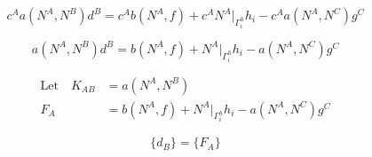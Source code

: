 \documentclass[a4paper, 12pt]{article}
\begin{document}
\begin{equation*}
c^{A} a(N^{A}, N^{B})d^{B} 
 = c^{A} b( N^{A} , f) 
  + c^{A} N^{A}\Big|_{\Gamma^{h}_{i}} h_{i} 
  - c^{A}a( N^{A}, N^{C})g^{C} 
\end{equation*}

\begin{equation*}
a(N^{A}, N^{B})d^{B} 
 = b( N^{A} , f) 
  + N^{A}\Big|_{\Gamma^{h}_{i}} h_{i} 
  - a( N^{A}, N^{C})g^{C} 
\end{equation*}

\begin{align*}
\text{Let}\quad K_{AB} &= a(N^{A}, N^{B}) \\
F_A &= b( N^{A} , f) 
  + N^{A}\Big|_{\Gamma^{h}_{i}} h_{i} 
  - a( N^{A}, N^{C})g^{C} 
\end{align*}

\begin{equation*}
[ K_{AB} ] \{ d_B \} = \{ F_A \} 
\end{equation*} 
\end{document}

